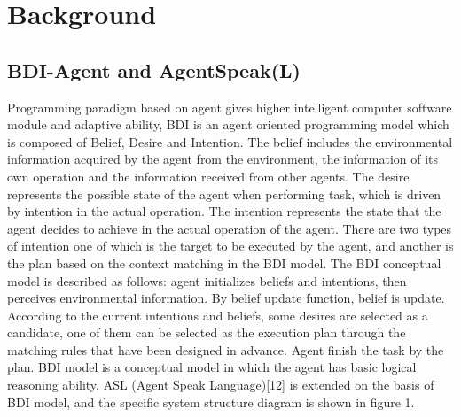 \documentclass{article}
\begin{document}
\section{Background}
\subsection{ BDI-Agent and AgentSpeak(L)}
Programming paradigm based on agent gives higher intelligent
computer software module and adaptive ability, BDI is an agent
oriented programming model which is composed of Belief, Desire
and Intention. The belief includes the environmental information
acquired by the agent from the environment, the information of its
own operation and the information received from other agents.
The desire represents the possible state of the agent when
performing task, which is driven by intention in the actual
operation. The intention represents the state that the agent decides
to achieve in the actual operation of the agent. There are two types
of intention one of which is the target to be executed by the agent,
and another is the plan based on the context matching in the BDI
model. The BDI conceptual model is described as follows: agent
initializes beliefs and intentions, then perceives environmental
information. By belief update function, belief is update.
According to the current intentions and beliefs, some desires are
selected as a candidate, one of them can be selected as the
execution plan through the matching rules that have been
designed in advance. Agent finish the task by the plan. BDI model
is a conceptual model in which the agent has basic logical
reasoning ability.
ASL (Agent Speak Language)[12] is extended on the basis of
BDI model, and the specific system structure diagram is shown
in figure 1.
\end{document}
